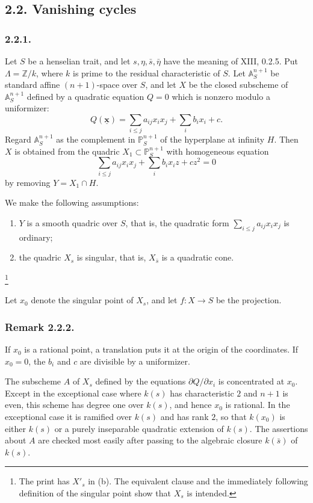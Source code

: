 \subsection*{2.2. Vanishing cycles}

\subsubsection*{2.2.1.}
Let $S$ be a henselian trait, and let
$s,\eta,\bar s,\bar\eta$ have the meaning of XIII, 0.2.5.  Put
$\Lambda=\mathbb Z/k$, where $k$ is prime to the residual
characteristic of $S$.  Let $\mathbb A^{n+1}_S$ be standard affine
$(n+1)$-space over $S$, and let $X$ be the closed subscheme of
$\mathbb A^{n+1}_S$ defined by a quadratic equation $Q=0$ which is
nonzero modulo a uniformizer:
\[
Q(\underline{\mathbf{x}})=\sum_{i\leq j}a_{ij}x_ix_j+\sum_i b_ix_i+c.
\]
Regard $\mathbb A^{n+1}_S$ as the complement in
$\mathbb P^{n+1}_S$ of the hyperplane at infinity $H$.  Then $X$ is
obtained from the quadric $X_1\subset\mathbb P^{n+1}_S$ with
homogeneous equation
\begin{equation}\tag{2.2.1.1}
\sum_{i\leq j}a_{ij}x_ix_j+\sum_i b_ix_iz+cz^2=0
\end{equation}
by removing $Y=X_1\cap H$.

We make the following assumptions:

\begin{enumerate}
\item[(a)] $Y$ is a smooth quadric over $S$, that is, the quadratic
form $\sum_{i\leq j}a_{ij}x_ix_j$ is ordinary;

\item[(b)] the quadric $X_s$ is singular, that is,
$X_{\bar s}$ is a quadratic cone.
\end{enumerate}
\footnote{The print has $X'_s$ in (b).  The equivalent clause and the
immediately following definition of the singular point show that
$X_s$ is intended.}

Let $x_0$ denote the singular point of $X_s$, and let
$f:X\to S$ be the projection.

\subsubsection*{Remark 2.2.2.}
If $x_0$ is a rational point, a translation puts it at the origin of
the coordinates.  If $x_0=0$, the $b_i$ and $c$ are divisible by a
uniformizer.

The subscheme $A$ of $X_s$ defined by the equations
$\partial Q/\partial x_i$ is concentrated at $x_0$.  Except in the
exceptional case where $k(s)$ has characteristic $2$ and $n+1$ is
even, this scheme has degree one over $k(s)$, and hence $x_0$ is
rational.  In the exceptional case it is ramified over $k(s)$ and
has rank $2$, so that $k(x_0)$ is either $k(s)$ or a purely
inseparable quadratic extension of $k(s)$.  The assertions about
$A$ are checked most easily after passing to the algebraic closure
$k(\bar s)$ of $k(s)$.

